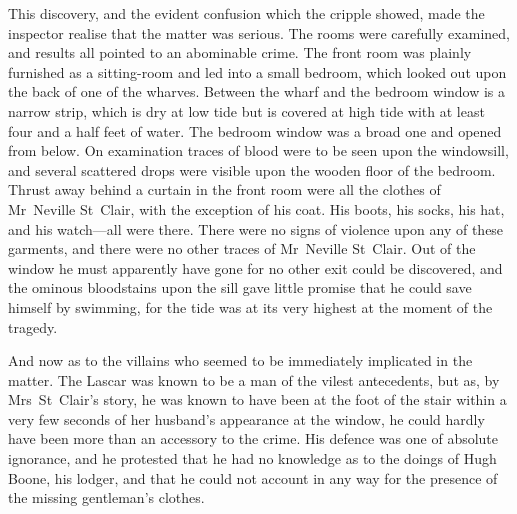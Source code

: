 This discovery, and the evident confusion which the cripple showed, made the inspector realise that the matter was serious. The rooms were carefully examined, and results all pointed to an abominable crime. The front room was plainly furnished as a sitting-room and led into a small bedroom, which looked out upon the back of one of the wharves. Between the wharf and the bedroom window is a narrow strip, which is dry at low tide but is covered at high tide with at least four and a half feet of water. The bedroom window was a broad one and opened from below. On examination traces of blood were to be seen upon the windowsill, and several scattered drops were visible upon the wooden floor of the bedroom. Thrust away behind a curtain in the front room were all the clothes of Mr~Neville St~Clair, with the exception of his coat. His boots, his socks, his hat, and his watch—all were there. There were no signs of violence upon any of these garments, and there were no other traces of Mr~Neville St~Clair. Out of the window he must apparently have gone for no other exit could be discovered, and the ominous bloodstains upon the sill gave little promise that he could save himself by swimming, for the tide was at its very highest at the moment of the tragedy.

And now as to the villains who seemed to be immediately implicated in the matter. The Lascar was known to be a man of the vilest antecedents, but as, by Mrs~St~Clair's story, he was known to have been at the foot of the stair within a very few seconds of her husband's appearance at the window, he could hardly have been more than an accessory to the crime. His defence was one of absolute ignorance, and he protested that he had no knowledge as to the doings of Hugh Boone, his lodger, and that he could not account in any way for the presence of the missing gentleman's clothes.

